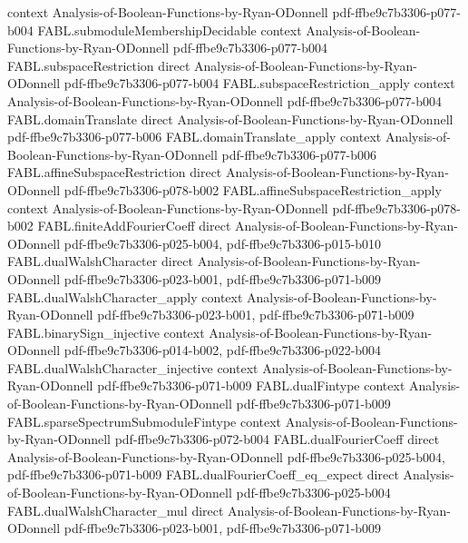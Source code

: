 \begin{theorem}
  {context}
  {Analysis-of-Boolean-Functions-by-Ryan-ODonnell}
  {pdf-ffbe9c7b3306-p077-b004}
\proofstep
  {FABL.submoduleMembershipDecidable}
  {context}
  {Analysis-of-Boolean-Functions-by-Ryan-ODonnell}
  {pdf-ffbe9c7b3306-p077-b004}
\proofstep
  {FABL.subspaceRestriction}
  {direct}
  {Analysis-of-Boolean-Functions-by-Ryan-ODonnell}
  {pdf-ffbe9c7b3306-p077-b004}
\proofstep
  {FABL.subspaceRestriction_apply}
  {context}
  {Analysis-of-Boolean-Functions-by-Ryan-ODonnell}
  {pdf-ffbe9c7b3306-p077-b004}
\proofstep
  {FABL.domainTranslate}
  {direct}
  {Analysis-of-Boolean-Functions-by-Ryan-ODonnell}
  {pdf-ffbe9c7b3306-p077-b006}
\proofstep
  {FABL.domainTranslate_apply}
  {context}
  {Analysis-of-Boolean-Functions-by-Ryan-ODonnell}
  {pdf-ffbe9c7b3306-p077-b006}
\proofstep
  {FABL.affineSubspaceRestriction}
  {direct}
  {Analysis-of-Boolean-Functions-by-Ryan-ODonnell}
  {pdf-ffbe9c7b3306-p078-b002}
\proofstep
  {FABL.affineSubspaceRestriction_apply}
  {context}
  {Analysis-of-Boolean-Functions-by-Ryan-ODonnell}
  {pdf-ffbe9c7b3306-p078-b002}
\proofstep
  {FABL.finiteAddFourierCoeff}
  {direct}
  {Analysis-of-Boolean-Functions-by-Ryan-ODonnell}
  {pdf-ffbe9c7b3306-p025-b004,
    pdf-ffbe9c7b3306-p015-b010}
\proofstep
  {FABL.dualWalshCharacter}
  {direct}
  {Analysis-of-Boolean-Functions-by-Ryan-ODonnell}
  {pdf-ffbe9c7b3306-p023-b001,
    pdf-ffbe9c7b3306-p071-b009}
\proofstep
  {FABL.dualWalshCharacter_apply}
  {context}
  {Analysis-of-Boolean-Functions-by-Ryan-ODonnell}
  {pdf-ffbe9c7b3306-p023-b001,
    pdf-ffbe9c7b3306-p071-b009}
\proofstep
  {FABL.binarySign_injective}
  {context}
  {Analysis-of-Boolean-Functions-by-Ryan-ODonnell}
  {pdf-ffbe9c7b3306-p014-b002,
    pdf-ffbe9c7b3306-p022-b004}
\proofstep
  {FABL.dualWalshCharacter_injective}
  {context}
  {Analysis-of-Boolean-Functions-by-Ryan-ODonnell}
  {pdf-ffbe9c7b3306-p071-b009}
\proofstep
  {FABL.dualFintype}
  {context}
  {Analysis-of-Boolean-Functions-by-Ryan-ODonnell}
  {pdf-ffbe9c7b3306-p071-b009}
\proofstep
  {FABL.sparseSpectrumSubmoduleFintype}
  {context}
  {Analysis-of-Boolean-Functions-by-Ryan-ODonnell}
  {pdf-ffbe9c7b3306-p072-b004}
\proofstep
  {FABL.dualFourierCoeff}
  {direct}
  {Analysis-of-Boolean-Functions-by-Ryan-ODonnell}
  {pdf-ffbe9c7b3306-p025-b004,
    pdf-ffbe9c7b3306-p071-b009}
\proofstep
  {FABL.dualFourierCoeff_eq_expect}
  {direct}
  {Analysis-of-Boolean-Functions-by-Ryan-ODonnell}
  {pdf-ffbe9c7b3306-p025-b004}
\proofstep
  {FABL.dualWalshCharacter_mul}
  {direct}
  {Analysis-of-Boolean-Functions-by-Ryan-ODonnell}
  {pdf-ffbe9c7b3306-p023-b001,
    pdf-ffbe9c7b3306-p071-b009}

\end{theorem}
